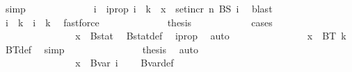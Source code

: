 \begin{isabellebody}
\ simp\isanewline
\ \ \ \ \ \ \ \ \ \ \isamarkupfalse%
\ \isamarkupfalse%
\ i\ \ i{\isacharunderscore}{\kern0pt}prop{\isacharcolon}{\kern0pt}\ {\isachardoublequoteopen}i\ {\isasymle}\ k\ {\isasymand}\ x\ {\isasymin}\ set{\isacharunderscore}{\kern0pt}incr\ n\ {\isacharparenleft}{\kern0pt}BS\ i{\isacharparenright}{\kern0pt}{\isachardoublequoteclose}\ \isamarkupfalse%
\ blast\isanewline
\ \ \ \ \ \ \ \ \ \ \isamarkupfalse%
\ \isamarkupfalse%
\ {\isachardoublequoteopen}i\ {\isacharequal}{\kern0pt}\ k{\isachardoublequoteclose}\ {\isacharbar}{\kern0pt}\ {\isachardoublequoteopen}i\ {\isacharless}{\kern0pt}\ k{\isachardoublequoteclose}\ \isamarkupfalse%
\ fastforce\isanewline
\ \ \ \ \ \ \ \ \ \ \isamarkupfalse%
\ \isamarkupfalse%
\ {\isacharquery}{\kern0pt}thesis\isanewline
\ \ \ \ \ \ \ \ \ \ \isamarkupfalse%
\ {\isacharparenleft}{\kern0pt}cases{\isacharparenright}{\kern0pt}\isanewline
\ \ \ \ \ \ \ \ \ \ \ \ \isamarkupfalse%
\ {}\isanewline
\ \ \ \ \ \ \ \ \ \ \ \ \isamarkupfalse%
\ \isamarkupfalse%
\ {\isachardoublequoteopen}x\ {\isasymin}\ Bstat{\isachardoublequoteclose}\ \isamarkupfalse%
\ Bstat{\isacharunderscore}{\kern0pt}def\ \isamarkupfalse%
\ i{\isacharunderscore}{\kern0pt}prop\ \isamarkupfalse%
\ auto\isanewline
\ \ \ \ \ \ \ \ \ \ \ \ \isamarkupfalse%
\ \isamarkupfalse%
\ {\isachardoublequoteopen}x\ {\isasymin}\ BT\ {\isacharparenleft}{\kern0pt}k{\isacharplus}{\kern0pt}{}{\isacharparenright}{\kern0pt}{\isachardoublequoteclose}\ \isamarkupfalse%
\ BT{\isacharunderscore}{\kern0pt}def\ \isamarkupfalse%
\ simp\isanewline
\ \ \ \ \ \ \ \ \ \ \ \ \isamarkupfalse%
\ \isamarkupfalse%
\ {\isacharquery}{\kern0pt}thesis\ \isamarkupfalse%
\ auto\isanewline
\ \ \ \ \ \ \ \ \ \ \isamarkupfalse%
\isanewline
\ \ \ \ \ \ \ \ \ \ \ \ \isamarkupfalse%
\ {}\isanewline
\ \ \ \ \ \ \ \ \ \ \ \ \isamarkupfalse%
\ \isamarkupfalse%
\ {\isachardoublequoteopen}x\ {\isasymin}\ Bvar\ {\isacharparenleft}{\kern0pt}i\ {\isacharplus}{\kern0pt}\ {}{\isacharparenright}{\kern0pt}{\isachardoublequoteclose}\ \isamarkupfalse%
\ Bvar{\isacharunderscore}{\kern0pt}def\ \isamarkupfalse%

\end{isabellebody}
